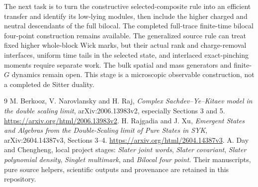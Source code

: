 \documentclass[11pt]{article}
\begin{document}
The next task is to turn the constructive selected-composite rule
into an efficient transfer and identify its low-lying modules,
then include the higher charged and neutral descendants of the
full bilocal. The completed full-trace finite-time bilocal four-point
construction remains available. The generalized source rule can
treat fixed higher whole-block Wick marks, but their actual rank
and charge-removal interfaces, uniform time tails in the selected
state, and interlaced exact-pinching moments require separate work.
The bulk spatial and mass generators and finite-$G$ dynamics remain
open. This stage is a microscopic observable construction, not a
completed de Sitter duality.

\begin{thebibliography}{9}
 M. Berkooz, V. Narovlansky and H. Raj,
\emph{Complex Sachdev--Ye--Kitaev model in the double scaling limit},
arXiv:2006.13983v2, especially Sections 3 and 5.
\url{https://arxiv.org/html/2006.13983v2}.
 H. Rajgadia and J. Xu,
\emph{Emergent States and Algebras from the Double-Scaling limit
of Pure States in SYK}, arXiv:2604.14387v3, Sections 3--4.
\url{https://arxiv.org/html/2604.14387v3}.
 A. Day and Chengheng, local project stages:
\emph{Slater joint words}, \emph{Slater covariant},
\emph{Slater polynomial density}, \emph{Singlet multimark}, and
\emph{Bilocal four point}. Their manuscripts, pure source helpers,
scientific outputs and provenance are retained in this repository.
\end{thebibliography}
\end{document}
